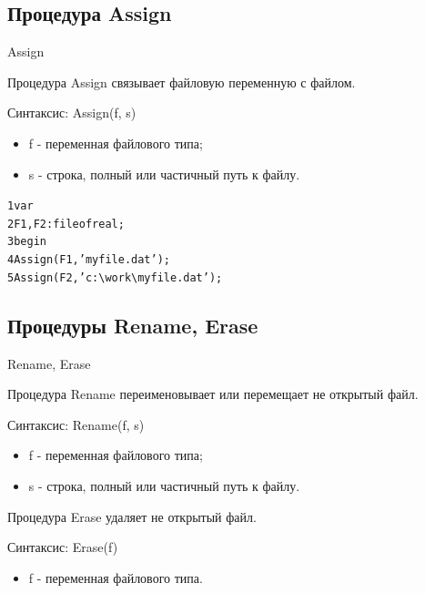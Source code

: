 \documentclass{beamer}
\begin{document}
\subsection{Процедура Assign}
\begin{frame}[fragile]{Assign}
\begin{block}{Процедура Assign}
связывает файловую переменную с файлом.
\end{block}
Синтаксис: Assign(f, s)
\begin{itemize}
\item f - переменная файлового типа;
\item s - строка, полный или частичный путь к файлу. 
\end{itemize}
\begin{alltt}
 1 var                  
 2   F1, F2: file of real;
 3 begin
 4   Assign(F1, 'myfile.dat');
 5   Assign(F2, 'c:\textbackslash work\textbackslash myfile.dat');
\end{alltt}
\end{frame} 

\subsection{Процедуры Rename, Erase}
\begin{frame}[fragile]{Rename, Erase}
\begin{block}{Процедура Rename}
переименовывает или перемещает не открытый файл.
\end{block}
Синтаксис: Rename(f, s)
\begin{itemize}
\item f - переменная файлового типа;
\item s - строка, полный или частичный путь к файлу. 
\end{itemize}
\begin{block}{Процедура Erase}
удаляет не открытый файл.
\end{block}
Синтаксис: Erase(f)
\begin{itemize}
\item f - переменная файлового типа.
\end{itemize}
\end{frame} 
\end{document}
